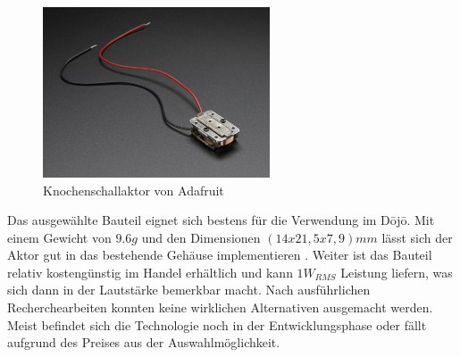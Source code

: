 \begin{figure}[H]
	\begin{center}
		\includegraphics[width=0.6\textwidth]{data/KnochenschallaktorAdafruit1.jpg}
		\caption[Knochenschallaktor \cite{BoneConductorAdafruit}]{Knochenschallaktor von Adafruit} %
		\label{fig:knochenschallAda}
	\end{center}
\end{figure}

Das ausgewählte Bauteil eignet sich bestens für die Verwendung im Dōjō. Mit einem Gewicht von $9.6 g$ und den Dimensionen $(14x21,5x7,9) mm$ lässt sich der Aktor gut in das bestehende Gehäuse implementieren \cite{BoneConductorAdafruit}. Weiter ist das Bauteil relativ kostengünstig im Handel erhältlich und kann $1W_{RMS}$ Leistung liefern, was sich dann in der Lautstärke bemerkbar macht. Nach ausführlichen Recherchearbeiten konnten keine wirklichen Alternativen ausgemacht werden. Meist befindet sich die Technologie noch in der Entwicklungsphase oder fällt aufgrund des Preises aus der Auswahlmöglichkeit.
